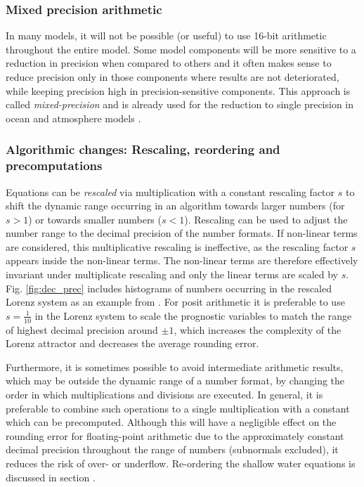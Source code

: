 \documentclass[draft]{agujournal2019}
\begin{document}
\subsubsection{Mixed precision arithmetic}

In many models, it will not be possible (or useful) to use 16-bit arithmetic
throughout the entire model. Some model components will be more sensitive to a
reduction in precision when compared to others and it often makes sense to reduce
precision only in those components where results are not deteriorated, while
keeping precision high in precision-sensitive components. This approach is
called \emph{mixed-precision} and is already used for the reduction to single
precision in ocean and atmosphere models \cite{Vana2017,TintoPrims2019}.

\subsubsection{Algorithmic changes: Rescaling, reordering and precomputations}

Equations can be \emph{rescaled} via multiplication with a constant rescaling
factor $s$ to shift the dynamic range occurring in an algorithm towards larger
numbers (for $s > 1$) or towards smaller numbers ($s < 1$).
Rescaling can be used to adjust the number range to the decimal precision of the
number formats. If non-linear terms are considered, this multiplicative rescaling
is ineffective, as the rescaling factor $s$ appears inside the non-linear terms.
The non-linear terms are therefore effectively invariant under multiplicate
rescaling and only the linear terms are scaled by $s$.
Fig. \ref{fig:dec_prec} includes histograms of numbers occurring in the rescaled
Lorenz system \cite{Lorenz1963,Kwasniok2014,Jeffress2017,Tantet2018} as an example
from . For posit arithmetic it is preferable to use
$s=\tfrac{1}{10}$ in the Lorenz system to scale the prognostic variables
to match the range of highest decimal precision around $\pm1$, which increases the
complexity of the Lorenz attractor and decreases the average rounding error.

Furthermore, it is sometimes possible to avoid intermediate arithmetic results,
which may be outside the dynamic range of a number format, by changing the order
in which multiplications and divisions are executed. In general, it is preferable
to combine such operations to a single multiplication with a constant which can
be precomputed. Although this will have a negligible effect on the rounding error
for floating-point arithmetic due to the approximately constant decimal precision
throughout the range of numbers (subnormals excluded), it reduces the risk of
over- or underflow. Re-ordering the shallow water equations is discussed in
section \label{sec:swm_rescale}.
\end{document}
